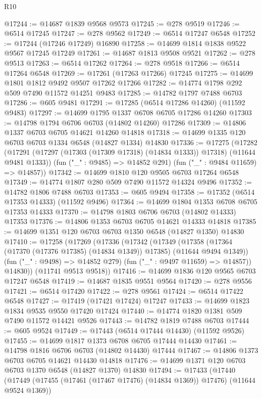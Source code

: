 \begin{lexlean}{R10}
\begin{coremodule}
{{{{{{{{{{{{{{{{{{{{{{{{{{{{{{{{{{{{{{{{{{{{{{{{{{{{{{{{{{{{{{{{{{{{{{{{{{{{{{{{{{{{@17244 := @14687 @1839 @9568 @9573
@17245 := @278 @9519
@17246 := @6514 @17245
@17247 := @278 @9562
@17249 := @6514 @17247 @6548
@17252 := @17244 (@17246 @17249) @16890
@17258 := @14699 @1814 @1838 @9522 @9567 @17245 @17249
@17261 := @14687 @1813 @9508 @9521
@17262 := @278 @9513
@17263 := @6514 @17262
@17264 := @278 @9518
@17266 := @6514 @17264 @6548
@17269 := @17261 (@17263 @17266) @17245
@17275 := @14699 @1801 @1812 @9492 @9507 @17262 @17266
@17282 := @14774 @1798 @292 @509 @7490 @11572 @14251 @9483
@17285 := @14782 @1797 @7488 @6703
@17286 := @605 @9481
@17291 := @17285 (@6514 @17286 @14260) (@11592 @9483)
@17297 := @14699 @1795 @1337 @6708 @6705 @17286 @14260
@17303 := @14798 @1794 @6706 @6703 (@14802 @14260) @17286
@17309 := @14806 @1337 @6703 @6705 @14621 @14260 @14818
@17318 := @14699 @1335 @120 @6703 @6703 @1334 @6548 (@14827 @1334) @14830
@17336 := @17275
    (@17282
      (@17291 (@17297 (@17303 (@17309 @17318) (@14834 @1333)) @17318) (@11644 @9481 @1333))
      (fun ("_" : @9485) => @14852 @291)
      (fun ("_" : @9484 @11659) => @14857))
@17342 := @14699 @1810 @120 @9505 @6703 @17264 @6548
@17349 := @14774 @1807 @280 @509 @7490 @11572 @14324 @9496
@17352 := @14782 @1806 @7488 @6703
@17353 := @605 @9494
@17358 := @17352 (@6514 @17353 @14333) (@11592 @9496)
@17364 := @14699 @1804 @1353 @6708 @6705 @17353 @14333
@17370 := @14798 @1803 @6706 @6703 (@14802 @14333) @17353
@17376 := @14806 @1353 @6703 @6705 @14621 @14333 @14818
@17385 := @14699 @1351 @120 @6703 @6703 @1350 @6548 (@14827 @1350) @14830
@17410 := @17258
    (@17269
      (@17336
        (@17342
          (@17349
            (@17358 (@17364 (@17370 (@17376 @17385) (@14834 @1349)) @17385) (@11644 @9494 @1349))
            (fun ("_" : @9498) => @14852 @279)
            (fun ("_" : @9497 @11659) => @14857))
          @14830))
      (@11741 @9513 @9518))
@17416 := @14699 @1836 @120 @9565 @6703 @17247 @6548
@17419 := @14687 @1835 @9551 @9564
@17420 := @278 @9556
@17421 := @6514 @17420
@17422 := @278 @9561
@17424 := @6514 @17422 @6548
@17427 := @17419 (@17421 @17424) @17247
@17433 := @14699 @1823 @1834 @9535 @9550 @17420 @17424
@17440 := @14774 @1820 @1381 @509 @7490 @11572 @14421 @9526
@17443 := @14782 @1819 @7488 @6703
@17444 := @605 @9524
@17449 := @17443 (@6514 @17444 @14430) (@11592 @9526)
@17455 := @14699 @1817 @1373 @6708 @6705 @17444 @14430
@17461 := @14798 @1816 @6706 @6703 (@14802 @14430) @17444
@17467 := @14806 @1373 @6703 @6705 @14621 @14430 @14818
@17476 := @14699 @1371 @120 @6703 @6703 @1370 @6548 (@14827 @1370) @14830
@17494 := @17433
    (@17440
      (@17449 (@17455 (@17461 (@17467 @17476) (@14834 @1369)) @17476) (@11644 @9524 @1369))
}}}}}}}}}}}}}}}}}}}}}}}}}}}}}}}}}}}}}}}}}}}}}}}}}}}}}}}}}}}}}}}}}}}}}}}}}}}}}}}}}}}}
\end{coremodule}
\end{lexlean}
